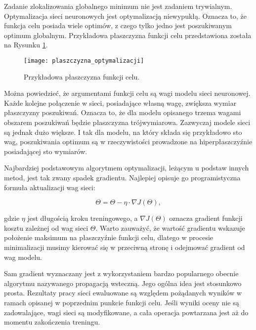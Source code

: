 \begin{enumerate}
    Zadanie zlokalizowania globalnego minimum nie jest zadaniem trywialnym.
    Optymalizacja sieci neuronowych jest optymalizacją niewypukłą. Oznacza to, że
    funkcja celu posiada wiele optimów, z czego tylko jedno jest poszukiwanym
    optimum globalnym. Przykładowa płaszczyzna funkcji celu przedstawiona
    została na Rysunku \ref{fig:plaszczyzna_optymalizacji}.

    \begin{figure}[!h]
      \centering
      \texttt{[image: plaszczyzna\_optymalizacji]}
      \caption[Przykładowa płaszczyzna funkcji celu - źródło: \url{https://towardsdatascience.com}]{Przykładowa płaszczyzna funkcji celu.}
      \label{fig:plaszczyzna_optymalizacji}
    \end{figure}

    Można powiedzieć, że argumentami funkcji celu są wagi modelu sieci neuronowej.
    Każde kolejne połączenie w sieci, posiadające własną wagę, zwiększa wymiar
    płaszczyzny poszukiwań. Oznacza to, że dla modelu opisanego trzema wagami
    obszarem poszukiwań będzie płaszczyzna trójwymiarowa. Zazwyczaj modele sieci
    są jednak dużo większe. I tak dla modelu, na który składa się przykładowo sto
    wag, poszukiwania optimum są w rzeczywistości prowadzone na hiperpłaszczyźnie
    posiadającej sto wymiarów.

    Najbardziej podstawowym algorytmem optymalizacji, leżącym u podstaw innych
    metod, jest tak zwany spadek gradientu. Najlepiej opisuje go programistyczna
    formuła aktualizacji wag sieci:

    \begin{equation}
    \Theta = \Theta - \eta \cdot \nabla J(\Theta),
    \end{equation}

    gdzie $\eta$ jest długością kroku treningowego, a $\nabla J(\Theta)$ oznacza
    gradient funkcji kosztu zależnej od wag sieci $\Theta$. Warto zauważyć, że
    wartość gradientu wskazuje położenie maksimum na płaszczyźnie funkcji celu,
    dlatego w procesie minimalizacji musimy kierować się w przeciwną stronę i odejmować
    gradient od wag modelu.

    Sam gradient wyznaczany jest z wykorzystaniem bardzo popularnego obecnie
    algorytmu nazywanego propagacją wsteczną. Jego ogólna idea jest stosunkowo
    prosta. Rezultaty pracy sieci ewaluowane są względem pożądanych wyników w
    ramach opisanej w poprzednim punkcie funkcji celu. Jeśli wyniki oceny nie są
    zadowalające, wagi sieci są modyfikowane, a cała operacja powtarzana jest aż
    do momentu zakończenia treningu.


\end{enumerate}
